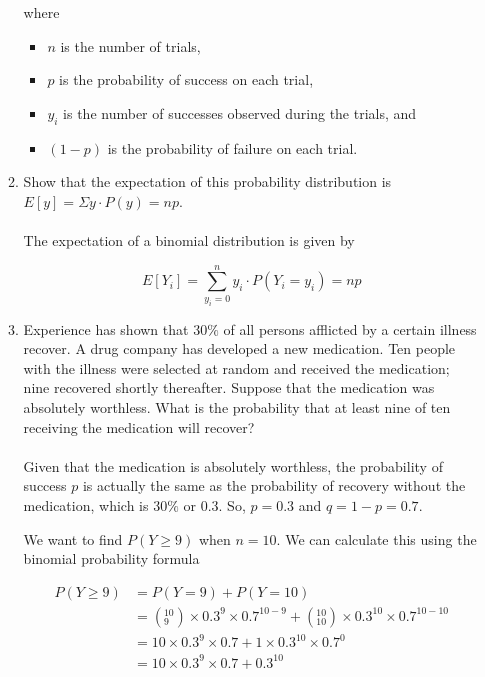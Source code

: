 \documentclass{article}
\begin{document}
\begin{enumerate}
\begin{enumerate}[label=2.\arabic*]
		            where

		            \begin{itemize}
			            \item $n$ is the number of trials,
			            \item $p$ is the probability of success on each trial,
			            \item $y_i$ is the number of successes observed during the trials, and
			            \item $(1 - p)$  is the probability of failure on each trial.
		            \end{itemize}
		      \item Show that the expectation of this probability distribution is $E[y] = \Sigma y \cdotp P(y) = np$.
		            \\~\\
		            The expectation of a binomial distribution is given by

		            \begin{equation}
			            E[Y_i] = \sum_{y_i=0}^{n} y_i \cdot P(Y_i = y_i) = np
		            \end{equation}

		      \item Experience has shown that $30\%$ of all persons afflicted by a certain illness recover. A drug company has developed a new medication. Ten people with the illness were selected at random and received the medication; nine recovered shortly thereafter. Suppose that the medication was absolutely worthless. What is the probability that at least nine of ten receiving the medication will recover?
		            \\~\\
		            Given that the medication is absolutely worthless, the probability of success $p$ is actually the same as the probability of recovery without the medication, which is $30\%$ or $0.3$. So, $p = 0.3$ and $q = 1 - p = 0.7$.

		            We want to find $P(Y \geq 9)$ when $n = 10$. We can calculate this using the binomial probability formula

		            \begin{equation}
			            \begin{split}
				            P(Y \geq 9) & = P(Y = 9) + P(Y = 10)                                                                               \\
				                        & = (_{9}^{10}) \times 0.3^{9} \times 0.7^{10 - 9} + (_{10}^{10}) \times 0.3^{10} \times 0.7^{10 - 10} \\
				                        & = 10 \times 0.3^{9} \times 0.7 + 1 \times 0.3^{10} \times 0.7^{0}                                    \\
				                        & = 10 \times 0.3^{9} \times 0.7 + 0.3^{10}                                                            \\
			            \end{split}
		            \end{equation}


\end{enumerate}
\end{enumerate}
\end{document}
